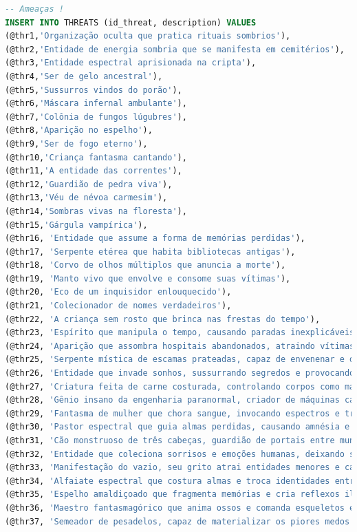 \documentclass[12pt,a4paper]{report}
\begin{document}
\begin{lstlisting}[language=SQL, caption=population.sql]
-- Ameaças !
INSERT INTO THREATS (id_threat, description) VALUES
(@thr1,'Organização oculta que pratica rituais sombrios'),
(@thr2,'Entidade de energia sombria que se manifesta em cemitérios'),
(@thr3,'Entidade espectral aprisionada na cripta'),
(@thr4,'Ser de gelo ancestral'),
(@thr5,'Sussurros vindos do porão'),
(@thr6,'Máscara infernal ambulante'),
(@thr7,'Colônia de fungos lúgubres'),
(@thr8,'Aparição no espelho'),
(@thr9,'Ser de fogo eterno'),
(@thr10,'Criança fantasma cantando'),
(@thr11,'A entidade das correntes'),
(@thr12,'Guardião de pedra viva'),
(@thr13,'Véu de névoa carmesim'),
(@thr14,'Sombras vivas na floresta'),
(@thr15,'Gárgula vampírica'),
(@thr16, 'Entidade que assume a forma de memórias perdidas'),
(@thr17, 'Serpente etérea que habita bibliotecas antigas'),
(@thr18, 'Corvo de olhos múltiplos que anuncia a morte'),
(@thr19, 'Manto vivo que envolve e consome suas vítimas'),
(@thr20, 'Eco de um inquisidor enlouquecido'),
(@thr21, 'Colecionador de nomes verdadeiros'),
(@thr22, 'A criança sem rosto que brinca nas frestas do tempo'),
(@thr23, 'Espírito que manipula o tempo, causando paradas inexplicáveis em relógios e eventos temporais anômalos'),
(@thr24, 'Aparição que assombra hospitais abandonados, atraindo vítimas com lamentos e visões de pacientes esquecidos'),
(@thr25, 'Serpente mística de escamas prateadas, capaz de envenenar e desaparecer entre reflexos'),
(@thr26, 'Entidade que invade sonhos, sussurrando segredos e provocando insônia e delírios'),
(@thr27, 'Criatura feita de carne costurada, controlando corpos como marionetes vivas'),
(@thr28, 'Gênio insano da engenharia paranormal, criador de máquinas caóticas e fenômenos tecnológicos inexplicáveis'),
(@thr29, 'Fantasma de mulher que chora sangue, invocando espectros e tragédias por onde passa'),
(@thr30, 'Pastor espectral que guia almas perdidas, causando amnésia e desorientação em suas vítimas'),
(@thr31, 'Cão monstruoso de três cabeças, guardião de portais entre mundos e julgador de viajantes'),
(@thr32, 'Entidade que coleciona sorrisos e emoções humanas, deixando suas vítimas apáticas e sem expressão'),
(@thr33, 'Manifestação do vazio, seu grito atrai entidades menores e causa terror absoluto'),
(@thr34, 'Alfaiate espectral que costura almas e troca identidades entre os vivos'),
(@thr35, 'Espelho amaldiçoado que fragmenta memórias e cria reflexos ilusórios para confundir suas vítimas'),
(@thr36, 'Maestro fantasmagórico que anima ossos e comanda esqueletos em sinfonias macabras'),
(@thr37, 'Semeador de pesadelos, capaz de materializar os piores medos dos que dormem nas proximidades'),

\end{lstlisting}
\end{document}
